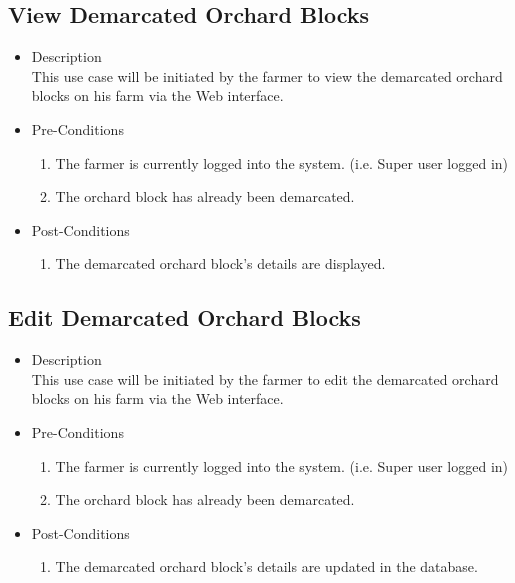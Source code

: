\documentclass[11pt,fleqn]{book} %
\begin{document}
		\subsection{View Demarcated Orchard Blocks}
		\begin{itemize}
			\item Description\\
			This use case will be initiated by the farmer to view the demarcated orchard blocks on his farm via the Web interface.
			\item Pre-Conditions
			\begin{enumerate}
				\item The farmer is currently logged into the system. (i.e. Super user logged in)
				\item The orchard block has already been demarcated.					
			\end{enumerate}
			\item Post-Conditions
			\begin{enumerate}
				\item The demarcated orchard block’s details are displayed.
			\end{enumerate}
		\end{itemize}
		
		\subsection{Edit Demarcated Orchard Blocks }
		\begin{itemize}
			\item Description\\
			This use case will be initiated by the farmer to edit the demarcated orchard blocks on his farm via the Web interface.
			\item Pre-Conditions
			\begin{enumerate}
				\item The farmer is currently logged into the system. (i.e. Super user logged in)
				\item The orchard block has already been demarcated.				
			\end{enumerate}
			\item Post-Conditions
			\begin{enumerate}
				\item The demarcated orchard block’s details are updated in the database.
			\end{enumerate}
		\end{itemize}
		
\end{document}
